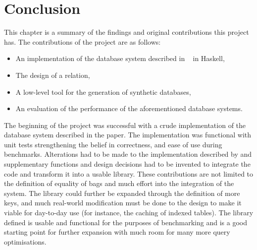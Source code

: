 \chapter{Conclusion}
\begin{comment}
Conclusions and Future Work
The project's conclusions should summarise the key insights that have been gained, be they positive or negative. For example, "The use of overloading in C++ provides a very elegant mechanism for transparent parallelisation of sequential programs", or "The overheads of linear-time n-body algorithms makes them computationally less efficient than O(n log n) algorithms for systems with less than 100000 particles". Avoid tedious personal reflections like "I learned a lot about C++ programming...". It is common to finish the report by listing ways in which the project can be taken further. This might, for example, be a plan for doing the project better if you could do a re-run, turning the project deliverables into a more polished end product, or extending the project into a programme for an MPhil or PhD.
\end{comment}
This chapter is a summary of the findings and original contributions this
project has. The contributions of the project are as follows:
\begin{itemize}
    \item An implementation of the database system described in
        \relalg{}~\cite{RelationalAlgebraByWayOfAdjunctions} in Haskell,
    \item The design of a  relation,
    \item A low-level tool for the generation of synthetic databases,
    \item An evaluation of the performance of the aforementioned database
        systems.
\end{itemize}

The beginning of the project was successful with a crude implementation of the
database system described in the paper. The implementation was functional with
unit tests strengthening the belief in correctness, and ease of use during
benchmarks. Alterations had to be made to the implementation described by
\relalg{} and supplementary functions and design decisions had to be invented to
integrate the code and transform it into a usable library. These contributions
are not limited to the definition of equality
of bags and much effort into the integration of the system. The library could further be
expanded through the definition of more keys, and much real-world modification
must be done to the design to make it viable for day-to-day use (for instance, the
caching of indexed tables). The library defined is usable and functional for the
purposes of benchmarking and is a good starting point for further expansion with
much room for many more query optimisations.

